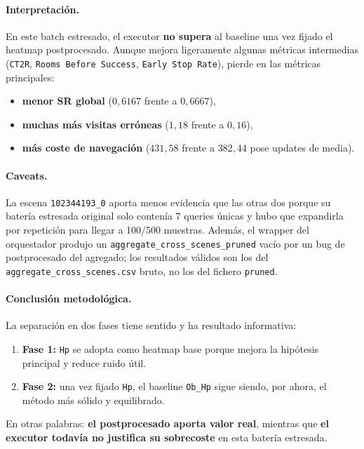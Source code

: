 \documentclass[11pt,a4paper]{article}
\begin{document}
\paragraph{Interpretación.} En este batch estresado, el executor \textbf{no
supera} al baseline una vez fijado el heatmap postprocesado. Aunque mejora
ligeramente algunas métricas intermedias (\texttt{CT2R},
\texttt{Rooms Before Success}, \texttt{Early Stop Rate}), pierde en las
métricas principales:
\begin{itemize}
  \item \textbf{menor SR global} ($0{,}6167$ frente a $0{,}6667$),
  \item \textbf{muchas más visitas erróneas}
        ($1{,}18$ frente a $0{,}16$),
  \item \textbf{más coste de navegación}
        ($431{,}58$ frente a $382{,}44$ pose updates de media).
\end{itemize}

\paragraph{Caveats.} La escena \texttt{102344193\_0} aporta menos evidencia que
las otras dos porque su batería estresada original solo contenía 7 queries
únicas y hubo que expandirla por repetición para llegar a 100/500 muestras.
Además, el wrapper del orquestador produjo un \texttt{aggregate\_cross\_scenes\_pruned}
vacío por un bug de postprocesado del agregado; los resultados válidos son los
del \texttt{aggregate\_cross\_scenes.csv} bruto, no los del fichero
\texttt{pruned}.

\paragraph{Conclusión metodológica.} La separación en dos fases tiene sentido y
ha resultado informativa:
\begin{enumerate}
  \item \textbf{Fase 1:} \texttt{Hp} se adopta como heatmap base porque mejora
        la hipótesis principal y reduce ruido útil.
  \item \textbf{Fase 2:} una vez fijado \texttt{Hp}, el baseline
        \texttt{Ob\_Hp} sigue siendo, por ahora, el método más sólido y
        equilibrado.
\end{enumerate}
En otras palabras: \textbf{el postprocesado aporta valor real}, mientras que
\textbf{el executor todavía no justifica su sobrecoste} en esta batería
estresada.
\end{document}
